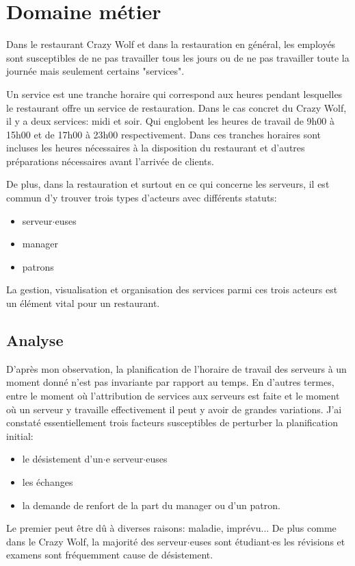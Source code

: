 
\chapter[Domaine métier]{Domaine métier}
Dans le restaurant Crazy Wolf et dans la restauration en général, les employés sont susceptibles de ne pas travailler tous les jours ou de ne pas travailler toute la journée mais seulement certains "services".

Un service est une tranche horaire qui correspond aux heures pendant lesquelles le restaurant offre un service de restauration. Dans le cas concret du Crazy Wolf, il y a deux services: midi et soir. Qui englobent les heures de travail de 9h00 à 15h00 et de 17h00 à 23h00 respectivement. Dans ces tranches horaires sont incluses les heures nécessaires à la disposition du restaurant et d'autres préparations nécessaires avant l'arrivée de clients.

De plus, dans la restauration et surtout en ce qui concerne les serveurs, il est commun d'y trouver trois types d'acteurs avec différents statuts: 
\smallskip
\begin{itemize}
    \item serveur$\cdot$euses
    \item manager 
    \item patrons
\end{itemize}
\smallskip
La gestion, visualisation et organisation des services parmi ces trois acteurs est un élément vital pour un restaurant.

\section[Analyse]{Analyse}
D'après mon observation, la planification de l'horaire de travail des serveurs à un moment donné n'est pas invariante par rapport au temps. En d'autres termes, entre le moment où l'attribution de services aux serveurs est faite et le moment où un serveur y travaille effectivement il peut y avoir de grandes variations. J'ai constaté essentiellement trois facteurs susceptibles de perturber la planification initial:
\smallskip
\begin{itemize}
    \item le désistement d'un$\cdot$e serveur$\cdot$euses
    \item les échanges
    \item la demande de renfort de la part du manager ou d'un patron.
\end{itemize}
\smallskip
Le premier peut être dû à diverses raisons: maladie, imprévu... De plus comme dans le Crazy Wolf, la majorité des serveur$\cdot$euses sont étudiant$\cdot$es les révisions et examens sont fréquemment cause de désistement.

